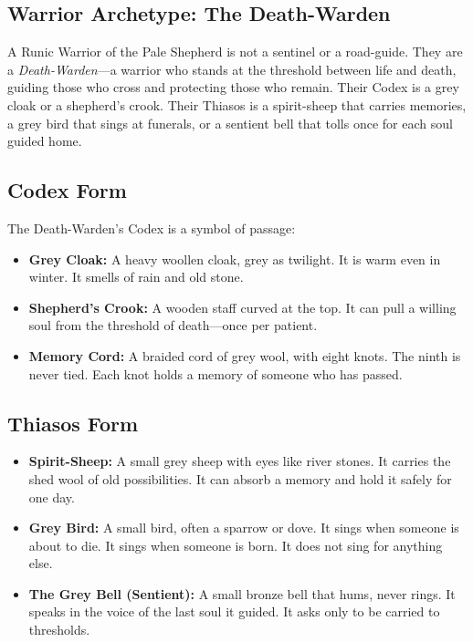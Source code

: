 \subsection{Warrior Archetype: The Death-Warden}

A Runic Warrior of the Pale Shepherd is not a sentinel or a road-guide. They are a \textit{Death-Warden}—a warrior who stands at the threshold between life and death, guiding those who cross and protecting those who remain. Their Codex is a grey cloak or a shepherd's crook. Their Thiasos is a spirit-sheep that carries memories, a grey bird that sings at funerals, or a sentient bell that tolls once for each soul guided home.

\subsection{Codex Form}

The Death-Warden's Codex is a symbol of passage:

\begin{itemize}
\item \textbf{Grey Cloak:} A heavy woollen cloak, grey as twilight. It is warm even in winter. It smells of rain and old stone.
\item \textbf{Shepherd's Crook:} A wooden staff curved at the top. It can pull a willing soul from the threshold of death—once per patient.
\item \textbf{Memory Cord:} A braided cord of grey wool, with eight knots. The ninth is never tied. Each knot holds a memory of someone who has passed.
\end{itemize}

\subsection{Thiasos Form}

\begin{itemize}
\item \textbf{Spirit-Sheep:} A small grey sheep with eyes like river stones. It carries the shed wool of old possibilities. It can absorb a memory and hold it safely for one day.
\item \textbf{Grey Bird:} A small bird, often a sparrow or dove. It sings when someone is about to die. It sings when someone is born. It does not sing for anything else.
\item \textbf{The Grey Bell (Sentient):} A small bronze bell that hums, never rings. It speaks in the voice of the last soul it guided. It asks only to be carried to thresholds.
\end{itemize}

